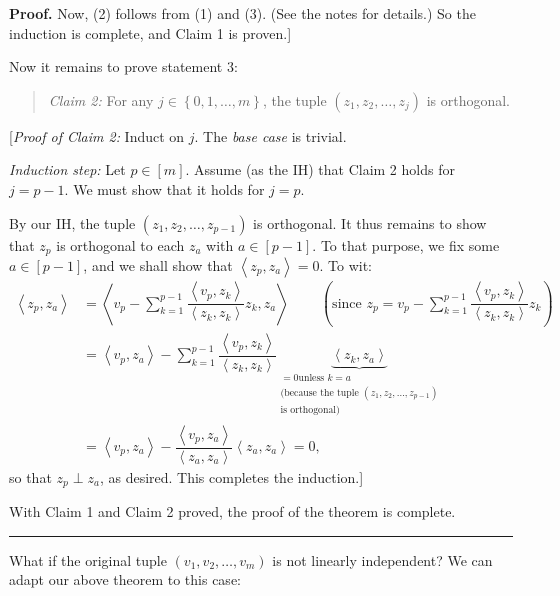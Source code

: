 \documentclass[numbers=enddot,12pt,final,onecolumn,notitlepage]{scrartcl}%
\numberwithin{exer}{subsection}
\theoremstyle{definition}
\newenvironment{statement}{\begin{quote}}{\end{quote}}
\newenvironment{proof}[1][Proof]{\noindent\textbf{#1.} }{\ \rule{0.5em}{0.5em}}
\let\sumnonlimits\sum
\renewcommand{\sum}{\sumnonlimits\limits}
\begin{document}
\begin{proof}
Now, (2) follows from (1) and (3). (See the notes for details.) So the
induction is complete, and Claim 1 is proven.]

Now it remains to prove statement 3:

\begin{statement}
\textit{Claim 2:} For any $j\in\left\{  0,1,\ldots,m\right\}  $, the tuple
$\left(  z_{1},z_{2},\ldots,z_{j}\right)  $ is orthogonal.
\end{statement}

[\textit{Proof of Claim 2:} Induct on $j$. The \textit{base case} is trivial.

\textit{Induction step:} Let $p\in\left[  m\right]  $. Assume (as the IH) that
Claim 2 holds for $j=p-1$. We must show that it holds for $j=p$.

By our IH, the tuple $\left(  z_{1},z_{2},\ldots,z_{p-1}\right)  $ is
orthogonal. It thus remains to show that $z_{p}$ is orthogonal to each $z_{a}$
with $a\in\left[  p-1\right]  $. To that purpose, we fix some $a\in\left[
p-1\right]  $, and we shall show that $\left\langle z_{p},z_{a}\right\rangle
=0$. To wit:%
\begin{align*}
\left\langle z_{p},z_{a}\right\rangle  &  =\left\langle v_{p}-\sum_{k=1}%
^{p-1}\dfrac{\left\langle v_{p},z_{k}\right\rangle }{\left\langle z_{k}%
,z_{k}\right\rangle }z_{k},z_{a}\right\rangle \ \ \ \ \ \ \ \ \ \ \left(
\text{since }z_{p}=v_{p}-\sum_{k=1}^{p-1}\dfrac{\left\langle v_{p}%
,z_{k}\right\rangle }{\left\langle z_{k},z_{k}\right\rangle }z_{k}\right) \\
&  =\left\langle v_{p},z_{a}\right\rangle -\sum_{k=1}^{p-1}\dfrac{\left\langle
v_{p},z_{k}\right\rangle }{\left\langle z_{k},z_{k}\right\rangle
}\underbrace{\left\langle z_{k},z_{a}\right\rangle }_{\substack{=0\text{
unless }k=a\\\text{(because the tuple }\left(  z_{1},z_{2},\ldots
,z_{p-1}\right)  \\\text{is orthogonal)}}}\\
&  =\left\langle v_{p},z_{a}\right\rangle -\dfrac{\left\langle v_{p}%
,z_{a}\right\rangle }{\left\langle z_{a},z_{a}\right\rangle }\left\langle
z_{a},z_{a}\right\rangle =0,
\end{align*}
so that $z_{p}\perp z_{a}$, as desired. This completes the induction.]

With Claim 1 and Claim 2 proved, the proof of the theorem is complete.
\end{proof}

What if the original tuple $\left(  v_{1},v_{2},\ldots,v_{m}\right)  $ is not
linearly independent? We can adapt our above theorem to this case:
\end{document}
